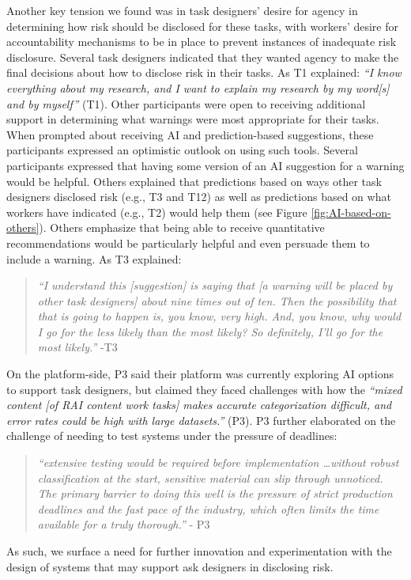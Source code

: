 
Another key tension we found was in task designers' desire for agency in determining how risk should be disclosed for these tasks, with workers' desire for accountability mechanisms to be in place to prevent instances of inadequate risk disclosure. Several task designers indicated that they wanted agency to make the final decisions about how to disclose risk in their tasks. As T1 explained: \textit{``I know everything about my research, and I want to explain my research by my word[s] and by myself''} (T1). Other participants were open to receiving additional support in determining what warnings were most appropriate for their tasks. When prompted about receiving AI and prediction-based suggestions, these participants expressed an optimistic outlook on using such tools. Several participants expressed that having some version of an AI suggestion for a warning would be helpful. Others explained that predictions based on ways other task designers disclosed risk (e.g., T3 and T12) as well as predictions based on what workers have indicated (e.g., T2) would help them (see Figure \ref{fig:AI-based-on-others}). Others emphasize that being able to receive quantitative recommendations would be particularly helpful and even persuade them to include a warning. As T3 explained:
\begin{quote}
    \textit{``I understand this [suggestion] is saying that [a warning will be placed by other task designers] about nine times out of ten. Then the possibility that that is going to happen is, you know, very high. And, you know, why would I go for the less likely than the most likely? So definitely, I'll go for the most likely.''} -T3
\end{quote}
On the platform-side, P3 said their platform was currently exploring AI options to support task designers, but claimed they faced challenges with how the \textit{``mixed content [of RAI content work tasks] makes accurate categorization difficult, and error rates could be high with large datasets.''} (P3). P3 further elaborated on the challenge of needing to test systems under the pressure of deadlines:
\begin{quote}
    \textit{``extensive testing would be required before implementation \dots without robust classification at the start, sensitive material can slip through unnoticed. The primary barrier to doing this well is the pressure of strict production deadlines and the fast pace of the industry, which often limits the time available for a truly thorough.''} - P3
\end{quote} 
As such, we surface a need for further innovation and experimentation with the design of systems that may support ask designers in disclosing risk.

